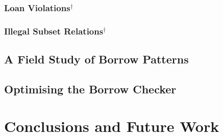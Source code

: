\documentclass[11pt,a4paper,twoside,openany]{report}
\newcommand{\fixme}[1] {{\color{red}#1}}
\newcommand{\notmine}[0] {$^\dagger$}
\begin{document}
\subsection{Loan Violations\notmine{}}

\subsection{Illegal Subset Relations\notmine{}}

\section{A Field Study of Borrow Patterns}\label{sec:field-study-borrow}

\section{Optimising the Borrow Checker}\label{sec:optim-borr-check}


\chapter{Conclusions and Future Work}\label{cha:conclusions}


\printbibliography[heading=bibintoc]
\end{document}
